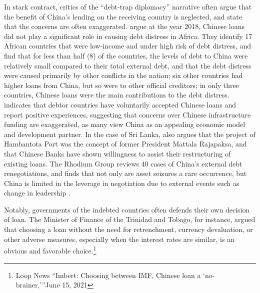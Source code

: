 In stark contract, critics of the ``debt-trap diplomacy'' narrative often argue that the benefit of China's lending on the receiving country is neglected, and state that the concerns are often exaggerated.
\citet*{Eom-18} argue at the year 2018, Chinese loans did not play a significant role in causing debt distress in Africa. They identify 17 African countries that were low-income and under high risk of debt distress, and find that for less than half (8) of the countries, the levels of debt to China were relatively small compared to their total external debt, and that the debt distress were caused primarily by other conflicts in the nation; six other countries had higher loans from China, but so were to other official creditors; in only three countries, Chinese loans were the main contributions to the debt distress.
\citet*{Brautigam-meme-2020} indicates that debtor countries have voluntarily accepted Chinese loans and report positive experiences, suggesting that concerns over Chinese infrastructure funding are exaggerated, as many view China as an appealing economic model and development partner.
In the case of Sri Lanka, \citet*{Brautigam-meme-2020} also argues that the project of Hambantota Port was the concept of former President Mattala Rajapaksa, and that Chinese Banks have shown willingness to assist their restructuring of existing loans.
The Rhodium Group reviews 40 cases of China's external debt renegotiations, and finds that not only are asset seizures a rare occurrence, but China is limited in the leverage in negotiation due to external events such as change in leadership \citep*{Rhodium-DTD-19}.

Notably, governments of the indebted countries often defends their own decision of loan. The Minister of Finance of the Trinidad and Tobago, for instance, argued that choosing a loan without the need for retrenchment, currency devaluation, or other adverse measures, especially when the interest rates are similar, is an obvious and favorable choice.\footnote{Loop News ``Imbert: Choosing between IMF, Chinese loan a `no-brainer,'''June 15, 2021}

